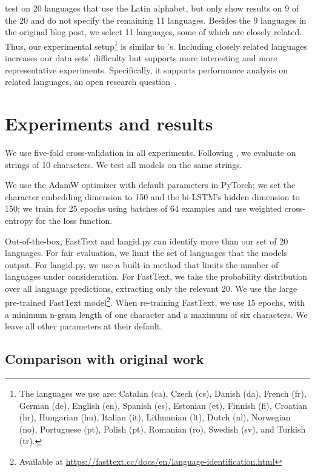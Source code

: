 \documentclass[11pt,a4paper]{article}
\newcommand{\fasttext}{FastText\xspace}
\newcommand{\langidpy}{langid.py\xspace}
\begin{document}
\citeauthor{apple} test on 20 languages that use the Latin alphabet, but only show results on 9 of the 20 and do not specify the remaining 11 languages. Besides the 9 languages in the original blog post, we select 11 languages, some of which are closely related. Thus, our experimental setup\footnote{The languages we use are: Catalan (ca), Czech (cs), Danish (da), French (fr), German (de), English (en), Spanish (es), Estonian (et), Finnish (fi), Croatian (hr), Hungarian (hu), Italian (it), Lithuanian (lt), Dutch (nl), Norwegian (no), Portuguese (pt), Polish (pt), Romanian (ro), Swedish (sv), and Turkish (tr).} is similar to \citeauthor{apple}'s. Including closely related languages increases our data sets' difficulty but supports more interesting and more representative experiments. Specifically, it supports performance analysis on related languages, an open research question~\cite{jauhiainen2019automatic}.


\section{Experiments and results}

We use five-fold cross-validation in all experiments. Following \citet{apple}, we evaluate on strings of 10 characters. We test all models on the same strings.

We use the AdamW optimizer with default parameters in PyTorch; we set the character embedding dimension to 150 and the bi-LSTM's hidden dimension to 150; we train for 25 epochs using batches of 64 examples and use weighted cross-entropy for the loss function.

Out-of-the-box, \fasttext and \langidpy can identify more than our set of 20 languages. For fair evaluation, we limit the set of languages that the models output. For \langidpy, we use a built-in method that limits the number of languages under consideration. For \fasttext, we take the probability distribution over all language predictions, extracting only the relevant 20. We use the large pre-trained \fasttext model\footnote{Available at \url{https://fasttext.cc/docs/en/language-identification.html}}. When re-training \fasttext, we use 15 epochs, with a minimum n-gram length of one character and a maximum of six characters. We leave all other parameters at their default.

\subsection{Comparison with original work}
\end{document}
